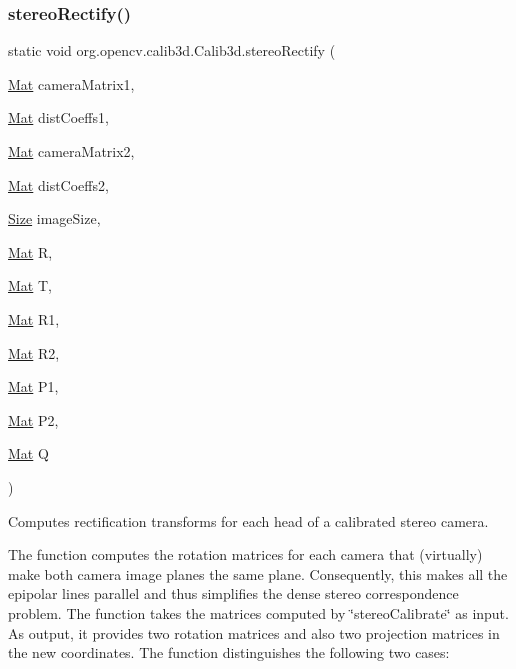 \subsubsection{\texorpdfstring{stereo\+Rectify()}{stereoRectify()}\hspace{0.1cm}{\footnotesize\ttfamily [2/2]}}
{\footnotesize\ttfamily static void org.\+opencv.\+calib3d.\+Calib3d.\+stereo\+Rectify (\begin{DoxyParamCaption}\item[{\mbox{\hyperlink{classorg_1_1opencv_1_1core_1_1_mat}{Mat}}}]{camera\+Matrix1,  }\item[{\mbox{\hyperlink{classorg_1_1opencv_1_1core_1_1_mat}{Mat}}}]{dist\+Coeffs1,  }\item[{\mbox{\hyperlink{classorg_1_1opencv_1_1core_1_1_mat}{Mat}}}]{camera\+Matrix2,  }\item[{\mbox{\hyperlink{classorg_1_1opencv_1_1core_1_1_mat}{Mat}}}]{dist\+Coeffs2,  }\item[{\mbox{\hyperlink{classorg_1_1opencv_1_1core_1_1_size}{Size}}}]{image\+Size,  }\item[{\mbox{\hyperlink{classorg_1_1opencv_1_1core_1_1_mat}{Mat}}}]{R,  }\item[{\mbox{\hyperlink{classorg_1_1opencv_1_1core_1_1_mat}{Mat}}}]{T,  }\item[{\mbox{\hyperlink{classorg_1_1opencv_1_1core_1_1_mat}{Mat}}}]{R1,  }\item[{\mbox{\hyperlink{classorg_1_1opencv_1_1core_1_1_mat}{Mat}}}]{R2,  }\item[{\mbox{\hyperlink{classorg_1_1opencv_1_1core_1_1_mat}{Mat}}}]{P1,  }\item[{\mbox{\hyperlink{classorg_1_1opencv_1_1core_1_1_mat}{Mat}}}]{P2,  }\item[{\mbox{\hyperlink{classorg_1_1opencv_1_1core_1_1_mat}{Mat}}}]{Q }\end{DoxyParamCaption})\hspace{0.3cm}{\ttfamily [static]}}

Computes rectification transforms for each head of a calibrated stereo camera.

The function computes the rotation matrices for each camera that (virtually) make both camera image planes the same plane. Consequently, this makes all the epipolar lines parallel and thus simplifies the dense stereo correspondence problem. The function takes the matrices computed by \char`\"{}stereo\+Calibrate\char`\"{} as input. As output, it provides two rotation matrices and also two projection matrices in the new coordinates. The function distinguishes the following two cases\+:


